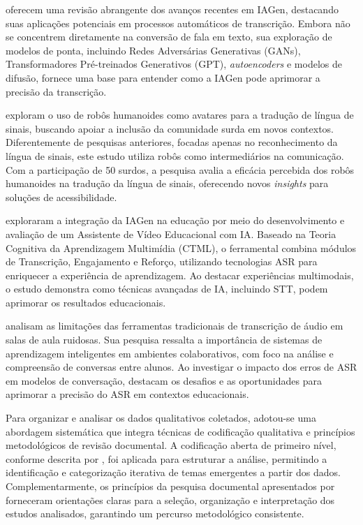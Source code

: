  oferecem uma revisão abrangente dos avanços recentes em IAGen, destacando suas aplicações potenciais em processos automáticos de transcrição. Embora não se concentrem diretamente na conversão de fala em texto, sua exploração de modelos de ponta, incluindo Redes Adversárias Generativas (GANs), Transformadores Pré-treinados Generativos (GPT), \textit{autoencoders} e modelos de difusão, fornece uma base para entender como a IAGen pode aprimorar a precisão da transcrição.

 exploram o uso de robôs humanoides como avatares para a tradução de língua de sinais, buscando apoiar a inclusão da comunidade surda em novos contextos. Diferentemente de pesquisas anteriores, focadas apenas no reconhecimento da língua de sinais, este estudo utiliza robôs como intermediários na comunicação. Com a participação de 50 surdos, a pesquisa avalia a eficácia percebida dos robôs humanoides na tradução da língua de sinais, oferecendo novos \textit{insights} para soluções de acessibilidade.

 exploraram a integração da IAGen na educação por meio do desenvolvimento e avaliação de um Assistente de Vídeo Educacional com IA. Baseado na Teoria Cognitiva da Aprendizagem Multimídia (CTML), o ferramental combina módulos de Transcrição, Engajamento e Reforço, utilizando tecnologias ASR para enriquecer a experiência de aprendizagem. Ao destacar experiências multimodais, o estudo demonstra como técnicas avançadas de IA, incluindo STT, podem aprimorar os resultados educacionais.

 analisam as limitações das ferramentas tradicionais de transcrição de áudio em salas de aula ruidosas. Sua pesquisa ressalta a importância de sistemas de aprendizagem inteligentes em ambientes colaborativos, com foco na análise e compreensão de conversas entre alunos. Ao investigar o impacto dos erros de ASR em modelos de conversação, destacam os desafios e as oportunidades para aprimorar a precisão do ASR em contextos educacionais.

Para organizar e analisar os dados qualitativos coletados, adotou-se uma abordagem sistemática que integra técnicas de codificação qualitativa e princípios metodológicos de revisão documental. A codificação aberta de primeiro nível, conforme descrita por , foi aplicada para estruturar a análise, permitindo a identificação e categorização iterativa de temas emergentes a partir dos dados. Complementarmente, os princípios da pesquisa documental apresentados por  forneceram orientações claras para a seleção, organização e interpretação dos estudos analisados, garantindo um percurso metodológico consistente.

